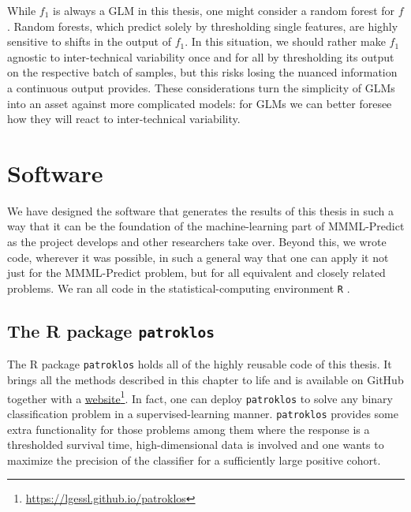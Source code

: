 While $f_1$ is always a GLM in this thesis, one might consider a random forest for $f$. Random 
forests, which predict solely by thresholding single features, are highly sensitive to shifts in 
the output of $f_1$. In this situation, we should rather make $f_1$ agnostic to inter-technical 
variability once and 
for all by thresholding its output on the respective batch of samples, but this risks losing the 
nuanced information a continuous output provides. These considerations turn the simplicity of GLMs 
into an asset against more complicated models: for GLMs we can better foresee how they will react 
to inter-technical variability.

\section{Software}

We have designed the software that generates the results of this thesis in such a way that it 
can be the foundation of the machine-learning part of MMML-Predict as the project develops and 
other researchers take over. Beyond this, we wrote code, wherever it was possible, in such 
a general way that one can apply it not just for the MMML-Predict problem, but for all equivalent 
and closely related problems. We ran all code in the statistical-computing environment \texttt{R}
\cite{r-language}.

\subsection{The R package \texttt{patroklos}}
The R package \texttt{patroklos} holds all of the highly reusable code of this thesis. It brings 
all the methods described in this chapter to life and is available on GitHub \cite{patroklos-gh} 
together with a 
\href{https://lgessl.github.io/patroklos/}{website}\footnote{\url{https://lgessl.github.io/patroklos}}. 
In fact, one can deploy 
\texttt{patroklos} to solve any binary classification problem in a supervised-learning manner.
\texttt{patroklos} provides some extra functionality for those problems among them where the 
response is a thresholded survival time, high-dimensional data is involved and one wants to maximize 
the precision of the classifier for a sufficiently large positive cohort.

